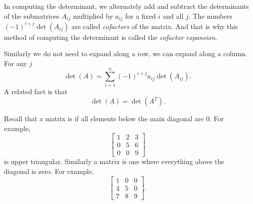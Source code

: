 In computing the determinant,
we alternately add and subtract the determinants of the submatrices
$A_{ij}$ multiplied by $a_{ij}$ for a fixed $i$ and all $j$.
The numbers ${(-1)}^{i+j}\det(A_{ij})$ are called
\emph{cofactors}
of the matrix.  And that is why
this method of computing the determinant is called the
\emph{cofactor expansion}.

Similarly we do not need to expand along a row, we can expand
along a column.  For any $j$
\begin{equation*}
\det (A)
=
\sum_{i=1}^n
{(-1)}^{i+j}
a_{ij} \det (A_{ij}) .
\end{equation*}
A related fact is that
\begin{equation*}
\det (A) = \det (A^T) .
\end{equation*}

\medskip

Recall that a matrix is \emph{} if all elements below
the main diagonal are 0.  For example,
\begin{equation*}
\begin{bmatrix}
1 & 2 & 3 \\
0 & 5 & 6 \\
0 & 0 & 9
\end{bmatrix}
\end{equation*}
is upper triangular.  Similarly a \emph{}
matrix is one where everything above the diagonal is zero.  For example,
\begin{equation*}
\begin{bmatrix}
1 & 0 & 0 \\
4 & 5 & 0 \\
7 & 8 & 9
\end{bmatrix} .
\end{equation*}

